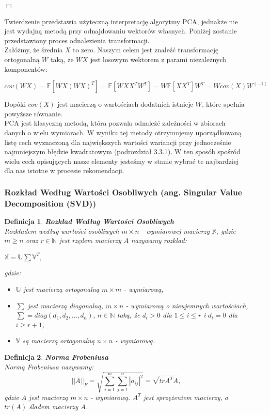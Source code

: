 \documentclass[12pt,a4paper]{report}
\newtheorem{df}{Definicja}
\begin{document}
\begin{flushright}
$\Box$
\end{flushright}
Twierdzenie przedstawia użyteczną interpretację algorytmy PCA, jednakże nie jest wydajną metodą przy odnajdowaniu wektorów własnych. Poniżej zostanie przedstawiony proces odnalezienia transformacji.
\\Załóżmy, że średnia $X$ to zero. Naszym celem jest znaleźć transformację ortogonalną $W$ taką, że $WX$ jest losowym wektorem z parami niezależnych komponentów:
\begin{center}
$cov(WX) = \mathbb{E}[WX(WX)^T]
= \mathbb{E}[WX X^T W^T]
=W \mathbb{E}[XX^T]W^T
=W cov(X)W^{(-1)}$
\end{center}
Dopóki $cov(X)$ jest macierzą o wartościach dodatnich istnieje $W$, które spełnia powyższe równanie.
\\PCA jest klasyczną metodą, która pozwala odnaleźć zależności w zbiorach danych o wielu wymiarach. W wyniku tej metody otrzymujemy uporządkowaną listę cech wyznaczoną dla największych wartości wariancji przy jednocześnie najmniejszym błędzie kwadratowym (podrozdział 3.3.1). W ten sposób spośród wielu cech opisujących nasze elementy jesteśmy w stanie wybrać te najbardziej dla nas istotne w procesie rekomendacji.
\subsubsection{Rozkład Według Wartości Osobliwych (ang. Singular Value Decomposition (SVD))} 
\begin{df} \textbf{Rozkład Według Wartości Osobliwych}%
\\Rozkładem według wartości osobliwych $m\times n$ - wymiarowej macierzy $\mathbb{X}$, gdzie $m\geq n$ oraz $r \in \mathbb{N}$ jest rzędem macierzy $A$ nazywamy rozkład:
\begin{center}
$\mathbb{X}=\mathbb{U}\sum \mathbb{V}^T$,
\end{center}  
gdzie:
\begin{itemize}
\item $\mathbb{U}$ jest macierzą ortogonalną $m \times m$ - wymiarową,
\item $\sum $ jest macierzą diagonalną, $m \times n$ - wymiarową o nieujemnych wartościach, $\sum = diag(d_1, d_2,..., d_n)$, $n \in \mathbb{N}$ taką, że $d_i>0$ dla $1\leq i \leq r$ i $d_i=0$ dla $i\geq r+1$,
\item $\mathbb{V}$ są macierzą ortogonalną $n \times n$ - wymiarową.
\end{itemize}
\end{df}
\begin{df}\textbf{Norma Frobeniusa}%
\\Normą Frobeniusa nazywamy:
$$||A||_F = \sqrt{\sum_{i=1}^m \sum_{j=1}^n |a_{ij}|^2} = \sqrt{tr A^T A},$$
gdzie $A$ jest macierzą $m\times n$ - wymiarową. $ A^T$ jest sprzężeniem macierzy, a $tr(A)$ śladem macierzy $A$.
\end{df}
\end{document}
